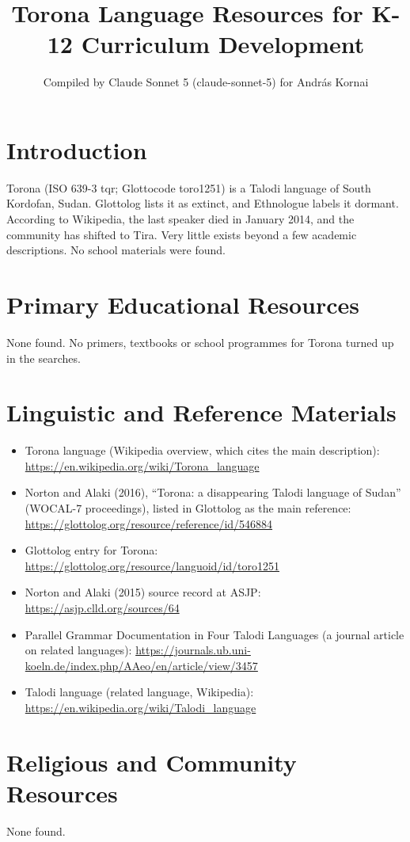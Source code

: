 \documentclass[12pt]{article}
\title{Torona Language Resources for K-12 Curriculum Development}
\author{Compiled by Claude Sonnet 5 (claude-sonnet-5) for Andr\'as Kornai}
\date{}
\begin{document}
\maketitle

\section{Introduction}
Torona (ISO 639-3 tqr; Glottocode toro1251) is a Talodi language of South Kordofan, Sudan. Glottolog lists it as extinct, and Ethnologue labels it dormant. According to Wikipedia, the last speaker died in January 2014, and the community has shifted to Tira. Very little exists beyond a few academic descriptions. No school materials were found.

\section{Primary Educational Resources}
None found. No primers, textbooks or school programmes for Torona turned up in the searches.

\section{Linguistic and Reference Materials}
\begin{itemize}
\item Torona language (Wikipedia overview, which cites the main description): \url{https://en.wikipedia.org/wiki/Torona_language}
\item Norton and Alaki (2016), ``Torona: a disappearing Talodi language of Sudan'' (WOCAL-7 proceedings), listed in Glottolog as the main reference: \url{https://glottolog.org/resource/reference/id/546884}
\item Glottolog entry for Torona: \url{https://glottolog.org/resource/languoid/id/toro1251}
\item Norton and Alaki (2015) source record at ASJP: \url{https://asjp.clld.org/sources/64}
\item Parallel Grammar Documentation in Four Talodi Languages (a journal article on related languages): \url{https://journals.ub.uni-koeln.de/index.php/AAeo/en/article/view/3457}
\item Talodi language (related language, Wikipedia): \url{https://en.wikipedia.org/wiki/Talodi_language}
\end{itemize}

\section{Religious and Community Resources}
None found.
\end{document}

